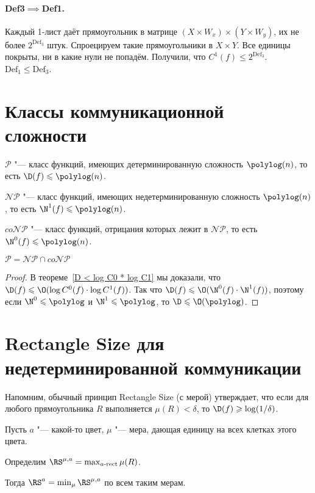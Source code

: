 \paragraph{Def3$\implies$Def1.}
Каждый 1-лист даёт прямоугольник в матрице $(X\times W_x) \times (Y\times W_y)$, их не более $2^{\mathrm{Def}_3}$ штук.
Спроецируем такие прямоугольники в $X\times Y$.
Все единицы покрыты, ни в какие нули не попадём. Получили, что $C^1(f)\leqslant 2^{\mathrm{Def}_3}$.
$\mathrm{Def}_1\leqslant \mathrm{Def}_3$.

\section{Классы коммуникационной сложности}

\begin{definition}
$\mathcal{P}$ "--- класс функций, имеющих детерминированную сложность $\polylog(n)$, то есть $\D(f)\leqslant\polylog(n)$.

$\mathcal{NP}$ "--- класс функций, имеющих недетерминированную сложность $\polylog(n)$, то есть $\N^1(f)\leqslant\polylog(n)$.

$co\mathcal{NP}$ "--- класс функций, отрицания которых лежит в $\mathcal{NP}$, то есть $\N^0(f)\leqslant\polylog(n)$.
\end{definition}

\begin{remark}
$\mathcal{P} = \mathcal{NP}\cap co\mathcal{NP}$
\end{remark}
\begin{proof}
В теореме~\ref{D < log C0 * log C1} мы доказали, что $\D(f)\leqslant \O(\log C^0(f) \cdot \log C^1(f))$. Так что $\D(f)\leqslant \O(\N^0(f)\cdot \N^1(f))$, поэтому если $\N^0\leqslant\polylog$ и $\N^1\leqslant\polylog$, то $\D \leqslant \O(\polylog)$.
\end{proof}

\section{Rectangle Size для недетерминированной коммуникации}
Напомним, обычный принцип Rectangle Size (с мерой) утверждает, что если для любого прямоугольника $R$ выполняется $\mu(R) < \delta$, то $\D(f)\geqslant \log(1/\delta)$.

\begin{definition}
Пусть $a$ "--- какой-то цвет, $\mu$ "--- мера, дающая единицу на всех клетках этого цвета.

Определим $\RS^{\mu, a} = \max_{a\text{-rect}} \mu(R)$.

Тогда $\RS^a = \min_\mu \RS^{\mu, a}$ по всем таким мерам.
\end{definition}

